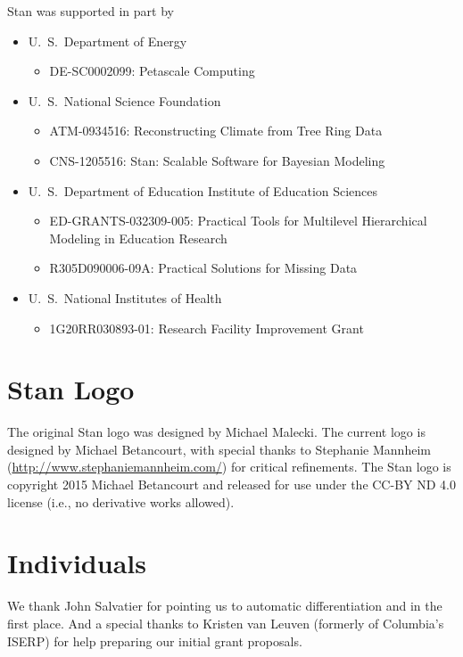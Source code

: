 Stan was supported in part by
%
\begin{itemize}
\item
U.~S.\ Department of Energy 
\begin{itemize}\small
\item DE-SC0002099: Petascale Computing
\end{itemize}
%
\item
U.~S.\ National Science Foundation 
\begin{itemize}\small
\item
ATM-0934516: Reconstructing Climate from Tree Ring Data
\item
CNS-1205516: Stan: Scalable Software for Bayesian Modeling
\end{itemize}
%
\item
U.~S.\ Department of Education Institute of Education Sciences 
\begin{itemize}\small
\item ED-GRANTS-032309-005:
Practical Tools for Multilevel Hierarchical Modeling in Education
 Research
\item R305D090006-09A: Practical Solutions for Missing Data
\end{itemize}
\item
U.~S.\ National Institutes of Health
\begin{itemize}
\item 1G20RR030893-01: Research Facility Improvement Grant
\end{itemize}
\end{itemize}


\section*{Stan Logo}

The original Stan logo was designed by Michael Malecki.  The current
logo is designed by Michael Betancourt, with special thanks to
Stephanie Mannheim (\url{http://www.stephaniemannheim.com/}) for
critical refinements.  The Stan logo is copyright 2015 Michael
Betancourt and released for use under the CC-BY ND 4.0 license (i.e.,
no derivative works allowed).


\section*{Individuals}

We thank John Salvatier for pointing us to automatic differentiation
and \HMC in the first place.  And a special thanks to Kristen van
Leuven (formerly of Columbia's ISERP) for help preparing our initial
grant proposals.

